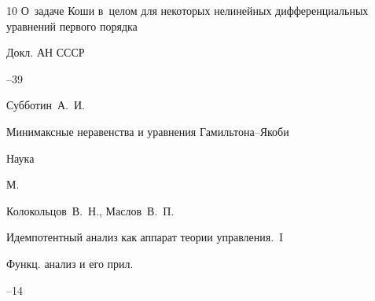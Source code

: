 \begin{thebibliography}{10}
\paper О~задаче Коши в~целом для некоторых нелинейных дифференциальных уравнений первого порядка

\jour Докл. АН СССР




--39











\by Субботин~А.~И.

\book Минимаксные неравенства и уравнения Гамильтона--Якоби


\publ Наука

\publaddr М.





\by Колокольцов~В.~Н., Маслов~В.~П.

\paper Идемпотентный анализ как аппарат теории управления.~I

\jour Функц. анализ и его прил.




--14















\end{thebibliography}
